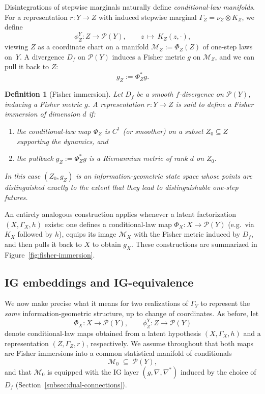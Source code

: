 \documentclass[11pt]{article}
\newtheorem{definition}{Definition}
\newcommand{\1}{\mathbf{1}}
\begin{document}
Disintegrations of stepwise marginals naturally define \emph{conditional-law manifolds}. For a representation $r:Y\to Z$ with induced stepwise marginal $\Gamma_Z = \nu_Z\otimes K_Z$, we define
\[
  \phi_Z^Y: Z \longrightarrow \mathcal{P}(Y),
  \qquad
  z \,\longmapsto\, K_Z(z,\cdot),
\]
viewing $Z$ as a coordinate chart on a manifold $\mathcal{M}_Z := \Phi_Z(Z)$ of one-step laws on~$Y$. A divergence $D_f$ on $\mathcal{P}(Y)$ induces a Fisher metric $g$ on $\mathcal{M}_Z$, and we can pull it back to $Z$:
\[
  g_Z := \Phi_Z^{\ast} g.
\]

\begin{definition}[Fisher immersion]
\label{def:fisher-immersion}
Let $D_f$ be a smooth $f$-divergence on $\mathcal{P}(Y)$, inducing a Fisher metric $g$. A representation $r:Y\to Z$ is said to define a \emph{Fisher immersion of dimension $d$} if:
\begin{enumerate}[label=(\roman*),leftmargin=1.5em]
  \item the conditional-law map $\Phi_Z$ is $C^1$ (or smoother) on a subset $Z_0\subseteq Z$ supporting the dynamics, and
  \item the pullback $g_Z := \Phi_Z^{\ast}g$ is a Riemannian metric of rank $d$ on $Z_0$.
\end{enumerate}
In this case $(Z_0,g_Z)$ is an information-geometric state space whose points are distinguished exactly to the extent that they lead to distinguishable one-step futures.
\end{definition}

An entirely analogous construction applies whenever a latent factorization $(X,\Gamma_X,h)$ exists: one defines a conditional-law map $\Phi_X : X\to\mathcal{P}(Y)$ (e.g.\ via $K_X$ followed by $h$), equips its image $\mathcal{M}_X$ with the Fisher metric induced by $D_f$, and then pulls it back to $X$ to obtain $g_X$. These constructions are summarized in Figure~\ref{fig:fisher-immersion}.

\subsection{IG embeddings and IG-equivalence}
\label{subsec:ig-embedding}

We now make precise what it means for two realizations of $\Gamma_Y$ to represent the \emph{same} information-geometric structure, up to change of coordinates. As before, let
\[
  \Phi_X : X \longrightarrow \mathcal{P}(Y),
  \qquad
  \phi_Z^Y: Z \longrightarrow \mathcal{P}(Y)
\]
denote conditional-law maps obtained from a latent hypothesis $(X,\Gamma_X,h)$ and a representation $(Z,\Gamma_Z,r)$, respectively. We assume throughout that both maps are Fisher immersions into a common statistical manifold of conditionals
\[
  \mathcal{M}_0 \;\subseteq\; \mathcal{P}(Y),
\]
and that $\mathcal{M}_0$ is equipped with the IG layer $(g,\nabla,\nabla^\ast)$ induced by the choice of $D_f$ (Section~\ref{subsec:dual-connections}).
\end{document}
